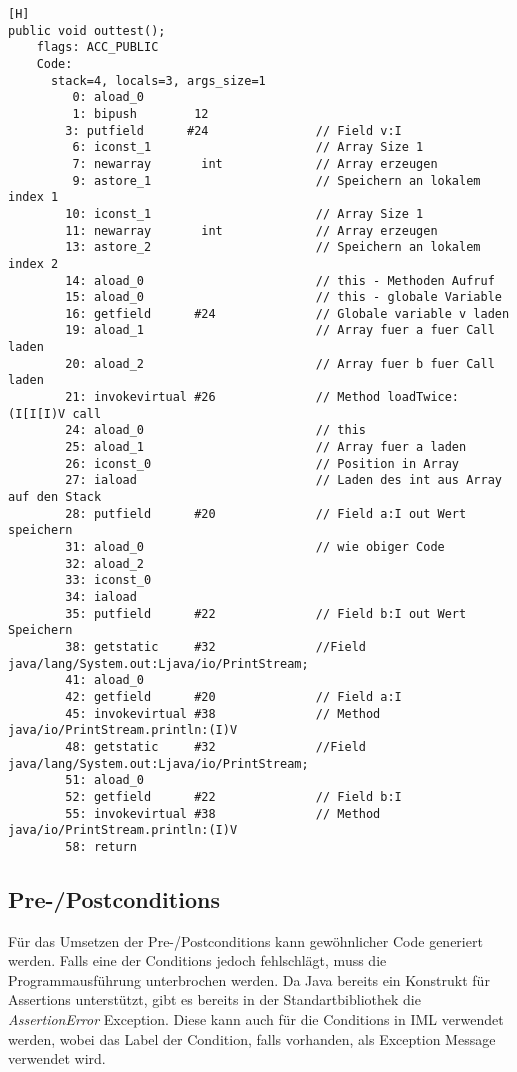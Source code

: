 \begin{lstlisting}[caption=Bytecode des Aufrufs der loadTwice Prozedur][H]
public void outtest();
    flags: ACC_PUBLIC
    Code:
      stack=4, locals=3, args_size=1
         0: aload_0       
         1: bipush        12
        3: putfield      #24               // Field v:I
         6: iconst_1                       // Array Size 1
         7: newarray       int             // Array erzeugen
         9: astore_1                       // Speichern an lokalem index 1
        10: iconst_1                       // Array Size 1
        11: newarray       int             // Array erzeugen
        13: astore_2                       // Speichern an lokalem index 2
        14: aload_0                        // this - Methoden Aufruf
        15: aload_0                        // this - globale Variable
        16: getfield      #24              // Globale variable v laden
        19: aload_1                        // Array fuer a fuer Call laden
        20: aload_2                        // Array fuer b fuer Call laden
        21: invokevirtual #26              // Method loadTwice:(I[I[I)V call
        24: aload_0                        // this
        25: aload_1                        // Array fuer a laden
        26: iconst_0                       // Position in Array
        27: iaload                         // Laden des int aus Array auf den Stack
        28: putfield      #20              // Field a:I out Wert speichern
        31: aload_0                        // wie obiger Code
        32: aload_2       
        33: iconst_0      
        34: iaload        
        35: putfield      #22              // Field b:I out Wert Speichern
        38: getstatic     #32              //Field java/lang/System.out:Ljava/io/PrintStream;
        41: aload_0       
        42: getfield      #20              // Field a:I
        45: invokevirtual #38              // Method java/io/PrintStream.println:(I)V
        48: getstatic     #32              //Field java/lang/System.out:Ljava/io/PrintStream;
        51: aload_0       
        52: getfield      #22              // Field b:I
        55: invokevirtual #38              // Method java/io/PrintStream.println:(I)V
        58: return       
\end{lstlisting}

\subsection{Pre-/Postconditions}

Für das Umsetzen der Pre-/Postconditions kann gewöhnlicher Code generiert werden. Falls eine der Conditions
jedoch fehlschlägt, muss die Programmausführung unterbrochen werden. Da Java bereits ein Konstrukt für 
Assertions unterstützt, gibt es bereits in der Standartbibliothek die \textit{AssertionError} Exception.
Diese kann auch für die Conditions in IML verwendet werden, wobei das Label der Condition, falls vorhanden,
als Exception Message verwendet wird.
\newline

